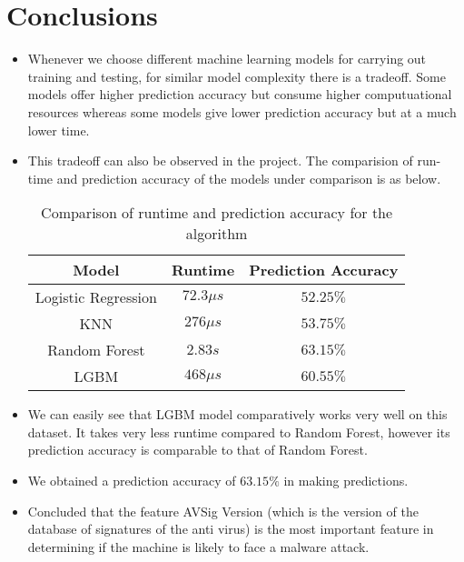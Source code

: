 \documentclass[conference]{IEEEtran}
\begin{document}
\section{Conclusions}
\begin{itemize}
    \item Whenever we choose different machine learning models for carrying out training and testing, for similar model complexity there is a tradeoff. Some models offer higher prediction accuracy but consume higher computuational resources whereas some models give lower prediction accuracy but at a much lower time.
    \item This tradeoff can also be observed in the project. The comparision of run-time and prediction accuracy of the models under comparison is as below.
          \begin{table}[H]
              \centering
              \begin{tabular}{|c|c|c|}
                  \hline
                  Model               & Runtime       & Prediction Accuracy \\ \hline
                  Logistic Regression & $72.3 \mu s $ & $52.25 \%$          \\
                  KNN                 & $276 \mu s$   & $53.75 \%$          \\
                  Random Forest       & $2.83 s$      & $63.15 \%$          \\
                  LGBM                & $468 \mu s$   & $60.55 \%$          \\
                  \hline
              \end{tabular}
              \caption{Comparison of runtime and prediction accuracy for the algorithm}
          \end{table}
    \item We can easily see that LGBM model comparatively works very well on this dataset. It takes very less runtime compared to Random Forest, however its prediction accuracy is comparable to that of Random Forest.
    \item We obtained a prediction accuracy of $63.15 \%$ in making predictions.
    \item Concluded that the feature AVSig Version (which is the version of the database of signatures of the anti virus) is the most important feature in determining if the machine is likely to face a malware attack.
\end{itemize}
\end{document}
